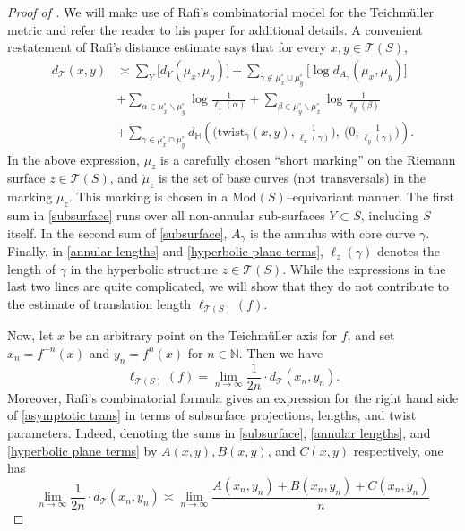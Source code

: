 \documentclass[11pt,letterpaper]{amsart}
\newcommand{\mr}{\mathring}
\newcommand{\teich}{\mathcal T}
\numberwithin{equation}{section}
\theoremstyle{definition}
\newcommand{\T}{\mathcal{T}}
\newcommand{\Mod}{\mathrm{Mod}}
\renewcommand{\setminus}{\smallsetminus}
\begin{document}
\begin{proof}[Proof of ]
We will make use of Rafi's combinatorial model for the Teichm{\"u}ller metric \cite[Theorem 6.1]{Rafi:Combinatorial} and refer the reader to his paper for additional details. A convenient restatement of Rafi's distance estimate
 \cite[Theorem 2.4 and Remark 2.5]{Rafi:Hyperbolicity} says that for every $x,y \in \T(S)$, 
\begin{align}
d_{\teich}(x,y) & \asymp \sum_{Y} \big[ d_{Y}(\mu_{x}, \mu_{y}) \big] + \sum_{\gamma \notin \mu_{x}^{\circ} \cup \mu_{y}^{\circ}} \big[ \log d_{A_\gamma}(\mu_{x}, \mu_{y}) \big] 
\label{subsurface} \\
& + \sum_{\alpha \in \mu_{x}^{\circ} \setminus \mu_{y}^{\circ}} \log \frac{1}{\ell_{x}(\alpha)} + \sum_{\beta \in \mu_{y}^{\circ} \setminus \mu_{x}^{\circ}} \log \frac{1}{\ell_y(\beta)}
\label{annular lengths}  \\
& + \sum_{\gamma \in \mu_{x}^{\circ} \cap \mu_{y}^{\circ}} d_{\mathbb{H}}\left( \Big( \mbox{twist}_{\gamma}(x,y), \frac{1}{\ell_{x}(\gamma)} \Big), \: \Big( 0, \frac{1}{\ell_y(\gamma)} \Big) \right).
\label{hyperbolic plane terms} 
\end{align}
In the above expression, $\mu_z$ is a carefully chosen ``short marking'' on the Riemann surface $z\in \T(S)$, and $\mr \mu_z$ is the set of base curves (not transversals) in the marking $\mu_z$. This marking is chosen in a $\Mod(S)$--equivariant manner. 
The first sum in \eqref{subsurface} runs over all non-annular sub-surfaces $Y \subset S$, including $S$ itself. 
In the second sum of \eqref{subsurface}, $A_\gamma$ is the annulus with core curve $\gamma$. Finally, in  \eqref{annular lengths} and \eqref{hyperbolic plane terms}, $\ell_z(\gamma)$ denotes the length of $\gamma$ in the hyperbolic structure $z \in \T(S)$. 
While the expressions in the last two lines are quite complicated, we will show that they do not contribute to the estimate of translation length $ \ell_{\teich(S)}(f)$.

Now, let $x$ be an arbitrary point on the Teichm{\"u}ller axis for $f$, and set $x_{n} = f^{-n}(x)$  and $y_{n} = f^{n}(x)$ for $n \in \mathbb{N}$.
Then we have 
\begin{equation} \label{asymptotic trans}
 \ell_{\teich(S)}(f) = \lim_{n \rightarrow \infty}\frac{1}{2n} \cdot d_{\teich} (x_{n}, y_{n}). 
\end{equation}
%
Moreover, Rafi's combinatorial formula gives an expression for the right hand side of \eqref{asymptotic trans} in terms of subsurface projections, lengths, and twist parameters. Indeed, denoting the sums in \eqref{subsurface}, \eqref{annular lengths}, and \eqref{hyperbolic plane terms} by $A(x,y), B(x,y)$, and $C(x,y)$ respectively, one has 
\begin{equation}\label{RafiABC}
 \lim_{n \rightarrow \infty}\frac{1}{2n} \cdot d_{\teich} (x_{n}, y_{n}) 
\asymp \lim_{n\rightarrow \infty} \frac{A(x_{n}, y_{n}) + B(x_{n}, y_{n})+ C(x_{n}, y_{n})}{n}
\end{equation}


\end{proof}
\end{document}
